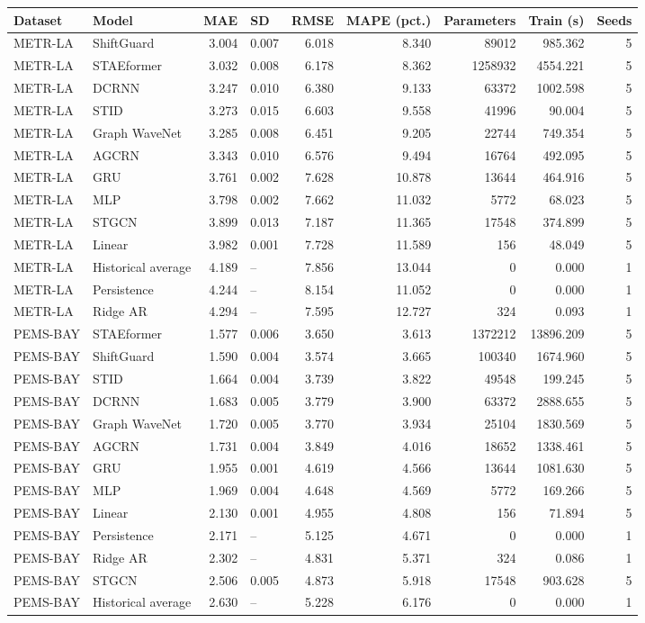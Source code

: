 \begin{tabular}{llrlrrrrr}
\toprule
Dataset & Model & MAE & SD & RMSE & MAPE (pct.) & Parameters & Train (s) & Seeds \\
\midrule
METR-LA & ShiftGuard & 3.004 & 0.007 & 6.018 & 8.340 & 89012 & 985.362 & 5 \\
METR-LA & STAEformer & 3.032 & 0.008 & 6.178 & 8.362 & 1258932 & 4554.221 & 5 \\
METR-LA & DCRNN & 3.247 & 0.010 & 6.380 & 9.133 & 63372 & 1002.598 & 5 \\
METR-LA & STID & 3.273 & 0.015 & 6.603 & 9.558 & 41996 & 90.004 & 5 \\
METR-LA & Graph WaveNet & 3.285 & 0.008 & 6.451 & 9.205 & 22744 & 749.354 & 5 \\
METR-LA & AGCRN & 3.343 & 0.010 & 6.576 & 9.494 & 16764 & 492.095 & 5 \\
METR-LA & GRU & 3.761 & 0.002 & 7.628 & 10.878 & 13644 & 464.916 & 5 \\
METR-LA & MLP & 3.798 & 0.002 & 7.662 & 11.032 & 5772 & 68.023 & 5 \\
METR-LA & STGCN & 3.899 & 0.013 & 7.187 & 11.365 & 17548 & 374.899 & 5 \\
METR-LA & Linear & 3.982 & 0.001 & 7.728 & 11.589 & 156 & 48.049 & 5 \\
METR-LA & Historical average & 4.189 & -- & 7.856 & 13.044 & 0 & 0.000 & 1 \\
METR-LA & Persistence & 4.244 & -- & 8.154 & 11.052 & 0 & 0.000 & 1 \\
METR-LA & Ridge AR & 4.294 & -- & 7.595 & 12.727 & 324 & 0.093 & 1 \\
PEMS-BAY & STAEformer & 1.577 & 0.006 & 3.650 & 3.613 & 1372212 & 13896.209 & 5 \\
PEMS-BAY & ShiftGuard & 1.590 & 0.004 & 3.574 & 3.665 & 100340 & 1674.960 & 5 \\
PEMS-BAY & STID & 1.664 & 0.004 & 3.739 & 3.822 & 49548 & 199.245 & 5 \\
PEMS-BAY & DCRNN & 1.683 & 0.005 & 3.779 & 3.900 & 63372 & 2888.655 & 5 \\
PEMS-BAY & Graph WaveNet & 1.720 & 0.005 & 3.770 & 3.934 & 25104 & 1830.569 & 5 \\
PEMS-BAY & AGCRN & 1.731 & 0.004 & 3.849 & 4.016 & 18652 & 1338.461 & 5 \\
PEMS-BAY & GRU & 1.955 & 0.001 & 4.619 & 4.566 & 13644 & 1081.630 & 5 \\
PEMS-BAY & MLP & 1.969 & 0.004 & 4.648 & 4.569 & 5772 & 169.266 & 5 \\
PEMS-BAY & Linear & 2.130 & 0.001 & 4.955 & 4.808 & 156 & 71.894 & 5 \\
PEMS-BAY & Persistence & 2.171 & -- & 5.125 & 4.671 & 0 & 0.000 & 1 \\
PEMS-BAY & Ridge AR & 2.302 & -- & 4.831 & 5.371 & 324 & 0.086 & 1 \\
PEMS-BAY & STGCN & 2.506 & 0.005 & 4.873 & 5.918 & 17548 & 903.628 & 5 \\
PEMS-BAY & Historical average & 2.630 & -- & 5.228 & 6.176 & 0 & 0.000 & 1 \\
\bottomrule
\end{tabular}
